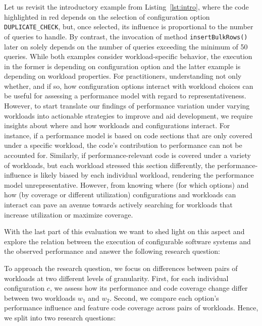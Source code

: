 Let us revisit the introductory example from Listing~\ref{lst:intro}, where the code highlighted in red depends on the selection of configuration option \texttt{DUPLICATE\_CHECK}, but, once selected, its influence is proportional to the number of queries to handle. By contrast, the invocation of method \texttt{insertBulkRows()} later on solely depends on the number of queries exceeding the minimum of 50 queries. While both examples consider workload-specific behavior, the execution in the former is depending on configuration option and the latter example is depending on workload properties. 
For practitioners, understanding not only whether, and if so, how configuration options interact with workload choices can be useful for assessing a performance model with regard to representativeness. However, to start translate our findings of performance variation under varying workloads into actionable strategies to improve and aid development, we require insights about where and how workloads and configurations interact. For instance, if a performance model is based on code sections that are only covered under a specific workload, the code’s contribution to performance can not be accounted for. Similarly, if performance-relevant code is covered under a variety of workloads, but each workload stressed this section differently, the performance-influence is likely biased by each individual workload, rendering the performance model unrepresentative. However, from knowing where (for which options) and how (by coverage or different utilization) configurations and workloads can interact can pave an avenue towards actively searching for workloads that increase utilization or maximize coverage.

With the last part of this evaluation we want to shed light on this aspect and explore the relation between the execution of configurable software systems and the observed performance and answer the following research question:


To approach the research question, we focus on differences between pairs of workloads at two different levels of granularity. First, for each individual configuration $c$, we assess  how its performance and code coverage change differ between two workloads $w_1$ and $w_2$. Second, we compare each option's performance influence and feature code coverage across pairs of workloads. Hence, we split  into two research questions:

